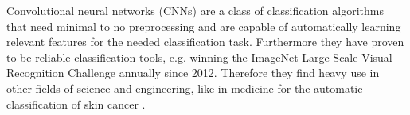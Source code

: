 
Convolutional neural networks (CNNs) are a class of classification algorithms that need minimal to no preprocessing and are capable of automatically learning relevant features for the needed classification task. Furthermore they have proven to be reliable classification tools, e.g. winning the ImageNet Large Scale Visual Recognition Challenge \cite{imagenet_cvpr09} annually since 2012. Therefore they find heavy use in other fields of science and engineering, like in medicine for the automatic classification of skin cancer \cite{CNNSkinCancer}. \\


